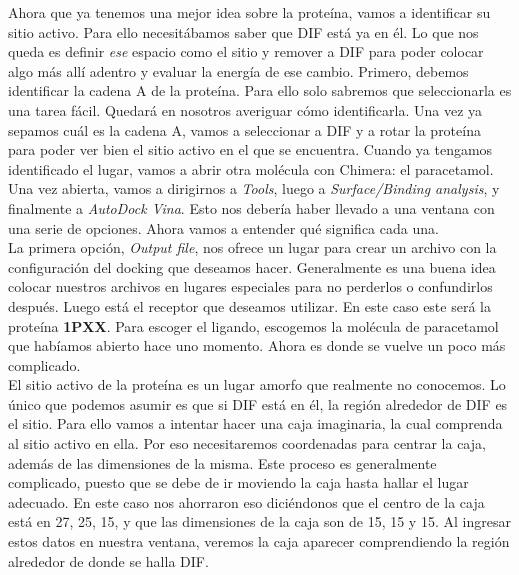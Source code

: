 \documentclass[10pt,letterpaper]{article}
\begin{document}
Ahora que ya tenemos una mejor idea sobre la prote\'ina, vamos a identificar su sitio activo. Para ello necesit\'abamos saber que DIF est\'a ya en \'el. Lo que nos queda es definir \emph{ese} espacio como el sitio y remover a DIF para poder colocar algo m\'as all\'i adentro y evaluar la energ\'ia de ese cambio. Primero, debemos identificar la cadena A de la prote\'ina. Para ello solo sabremos que seleccionarla es una tarea f\'acil. Quedar\'a en nosotros averiguar c\'omo identificarla. Una vez ya sepamos cu\'al es la cadena A, vamos a seleccionar a DIF y a rotar la prote\'ina para poder ver bien el sitio activo en el que se encuentra. Cuando ya tengamos identificado el lugar, vamos a abrir otra mol\'ecula con Chimera: el paracetamol. Una vez abierta, vamos a dirigirnos a \emph{Tools}, luego a \emph{Surface/Binding analysis}, y finalmente a \emph{AutoDock Vina}. Esto nos deber\'ia haber llevado a una ventana con una serie de opciones. Ahora vamos a entender qu\'e significa cada una.\\

La primera opci\'on, \emph{Output file}, nos ofrece un lugar para crear un archivo con la configuraci\'on del docking que deseamos hacer. Generalmente es una buena idea colocar nuestros archivos en lugares especiales para no perderlos o confundirlos despu\'es. Luego est\'a el receptor que deseamos utilizar. En este caso este ser\'a la prote\'ina \textbf{1PXX}. Para escoger el ligando, escogemos la mol\'ecula de paracetamol que hab\'iamos abierto hace uno momento. Ahora es donde se vuelve un poco m\'as complicado.\\

El sitio activo de la prote\'ina es un lugar amorfo que realmente no conocemos. Lo \'unico que podemos asumir es que si DIF est\'a en \'el, la regi\'on alrededor de DIF es el sitio. Para ello vamos a intentar hacer una caja imaginaria, la cual comprenda al sitio activo en ella. Por eso necesitaremos coordenadas para centrar la caja, adem\'as de las dimensiones de la misma. Este proceso es generalmente complicado, puesto que se debe de ir moviendo la caja hasta hallar el lugar adecuado. En este caso nos ahorraron eso dici\'endonos que el centro de la caja est\'a en 27, 25, 15, y que las dimensiones de la caja son de 15, 15 y 15. Al ingresar estos datos en nuestra ventana, veremos la caja aparecer comprendiendo la regi\'on alrededor de donde se halla DIF.\\
\end{document}
